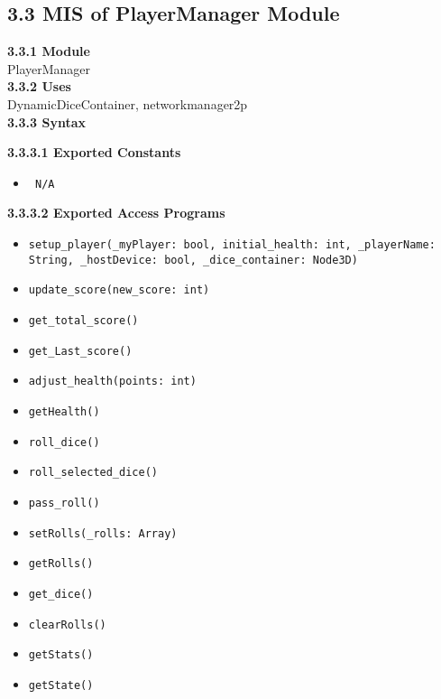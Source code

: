 \documentclass[12pt, titlepage]{article}
\begin{document}
\subsection*{3.3 MIS of PlayerManager Module}
\textbf{3.3.1 Module}\\
 PlayerManager\\

\noindent \textbf{3.3.2 Uses}\\
DynamicDiceContainer,  networkmanager2p\\

\noindent \textbf{3.3.3 Syntax}

\noindent \textbf{3.3.3.1 Exported Constants}
\begin{itemize}
	\item \texttt{ N/A}
\end{itemize}
\textbf{3.3.3.2 Exported Access Programs}
\begin{itemize}
	\item \texttt{setup\_player(\_myPlayer: bool, initial\_health: int, \_playerName: String, \_hostDevice: bool, \_dice\_container: Node3D)}
    \item \texttt{update\_score(new\_score: int)}
    \item \texttt{get\_total\_score()}
    \item \texttt{get\_Last\_score()}
    \item \texttt{adjust\_health(points: int)}
    \item \texttt{getHealth()}
    \item \texttt{roll\_dice()}
    \item \texttt{roll\_selected\_dice()}
    \item \texttt{pass\_roll()}
    \item \texttt{setRolls(\_rolls: Array)}
    \item \texttt{getRolls()}
    \item \texttt{get\_dice()}
    \item \texttt{clearRolls()}
    \item \texttt{getStats()}
    \item \texttt{getState()}
\end{itemize}
\end{document}
